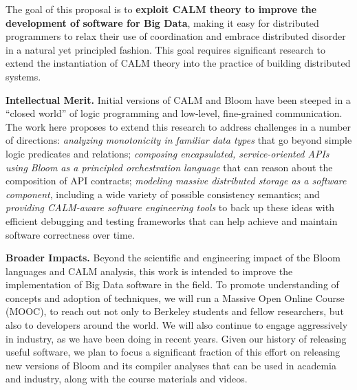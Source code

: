 The goal of this proposal is to \textbf{exploit CALM theory to improve the development of software for Big Data}, making it easy for distributed programmers to relax their use of coordination and embrace distributed disorder in a natural yet principled fashion.  This goal requires significant research to extend the instantiation of CALM theory into the practice of building distributed systems.  


\vspace{6pt}
\noindent \textbf{Intellectual Merit.} Initial versions of CALM and Bloom have been steeped in a ``closed world'' of logic programming and low-level, fine-grained communication.  The work here proposes to extend this research to address challenges in a number of directions: \emph{analyzing monotonicity in familiar data types} that go beyond simple logic predicates and relations; \emph{composing encapsulated, service-oriented APIs using Bloom as a principled orchestration language} that can reason about the composition of API contracts; \emph{modeling massive distributed storage as a software component}, including a wide variety of possible consistency semantics; and \emph{providing CALM-aware software engineering tools} to back up these ideas with efficient debugging and testing frameworks that can help achieve and maintain software correctness over time.
 
\vspace{6pt}
\noindent \textbf{Broader Impacts.} Beyond the scientific and engineering impact of the Bloom languages and CALM analysis, this work is intended to improve the implementation of Big Data software in the field.  To promote understanding of concepts and adoption of techniques, we will run a Massive Open Online Course (MOOC), to reach out not only to Berkeley students and fellow researchers, but also to developers around the world. We will also continue to engage aggressively in industry, as we have been doing in recent years.  Given our history of releasing useful software, we plan to focus a significant fraction of this effort on releasing new versions of Bloom and its compiler analyses that can be used in academia and industry, along with the course materials and videos.

